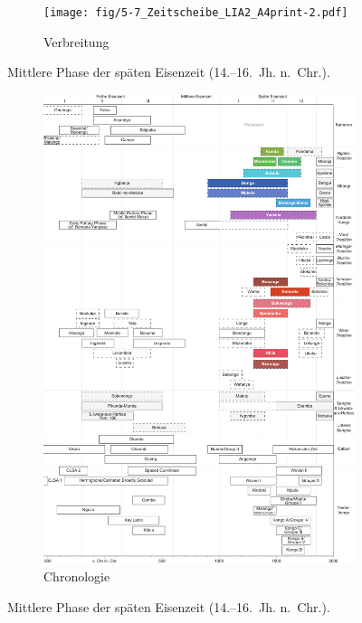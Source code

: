 \begin{figure}[p]
	\centering
	\begin{subfigure}[b]{\textwidth}
		\centering
		\texttt{[image: fig/5-7\_Zeitscheibe\_LIA2\_A4print-2.pdf]}
		\vspace{4cm}
		\caption{Verbreitung}
		\label{fig:LIA2_Karte}
	\end{subfigure}
	\caption{Mittlere Phase der späten Eisenzeit (14.--16.~Jh. n.~Chr.).}
	\label{fig:}
\end{figure}
\addtocounter{figure}{-1}
\begin{figure}[p]
	\begin{subfigure}[b]{\textwidth}
		\setcounter{subfigure}{1}
		\centering
		\includegraphics[height = .9\textheight]{fig/Chronologiesystem_v4_Zeitscheibe_LIA2.pdf}
		\caption{Chronologie}
		\label{fig:LIA2_Chronologie}
	\end{subfigure}
	\caption{Mittlere Phase der späten Eisenzeit (14.--16.~Jh. n.~Chr.).}
	\label{fig:LIA2}
\end{figure}

